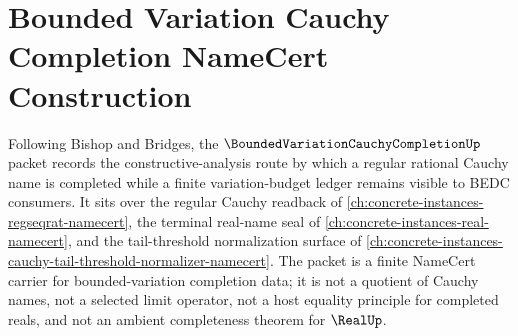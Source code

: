 \chapter{Bounded Variation Cauchy Completion NameCert Construction}
\label{ch:concrete-instances-bounded-variation-cauchy-completion-namecert}

Following Bishop and Bridges, the $\BoundedVariationCauchyCompletionUp$ packet records the constructive-analysis route by which a regular rational Cauchy name is completed while a finite variation-budget ledger remains visible to BEDC consumers. It sits over the regular Cauchy readback of \autoref{ch:concrete-instances-regseqrat-namecert}, the terminal real-name seal of \autoref{ch:concrete-instances-real-namecert}, and the tail-threshold normalization surface of \autoref{ch:concrete-instances-cauchy-tail-threshold-normalizer-namecert}. The packet is a finite NameCert carrier for bounded-variation completion data; it is not a quotient of Cauchy names, not a selected limit operator, not a host equality principle for completed reals, and not an ambient completeness theorem for $\RealUp$.


